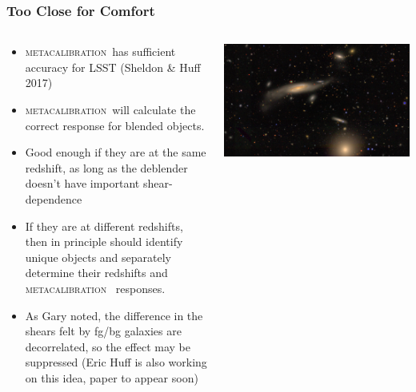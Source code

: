 \documentclass{beamer}
\newcommand{\mcal}{\textsc{metacalibration}}
\begin{document}
\frame
{
    \frametitle{Too Close for Comfort}
 
 
    \begin{columns}
        \begin{column}{0.6\textwidth}
            \begin{itemize}
                \item \mcal\ has sufficient accuracy for LSST (Sheldon \& Huff 2017)
                \item \mcal\ will calculate the correct response
                    for blended objects.
                \item Good enough if they are at the same redshift, as long as the deblender
                    doesn't have important shear-dependence
                \item If they are at different redshifts, then in principle
                    should identify unique objects and separately
                    determine their {\color{brightred} redshifts} and \mcal\ {\color{gold} responses}.

                \item As Gary noted, the difference in the shears felt by fg/bg
                    galaxies are decorrelated, so the effect may be suppressed
                    (Eric Huff is also working on this idea, paper to appear
                    soon)

            \end{itemize}
        \end{column}
        \begin{column}{0.4\textwidth}
            \begin{center}
                \includegraphics[width=1.2\textwidth, angle=90]{DES0056-5248_gri_crop.jpg}
            \end{center}
        \end{column}
    \end{columns}


}
\end{document}
